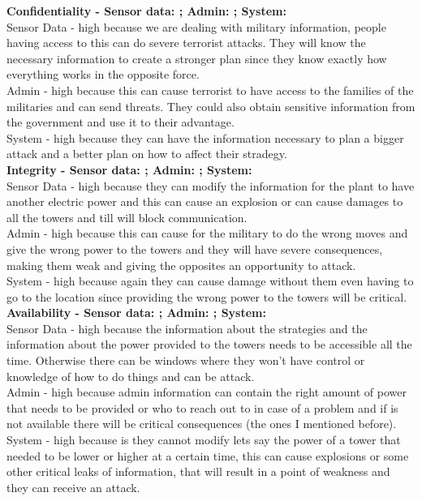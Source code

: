 \documentclass[12pt]{article}
\begin{document}
\begin{enumerate}
\begin{enumerate}
		\textbf{Confidentiality - Sensor data: ; Admin: ; System: } \\
		Sensor Data -  high because we are dealing with military information, people having access to this can do severe terrorist attacks. They will know the necessary information to create a stronger plan since they know exactly how everything works in the opposite force. \\
		Admin - high because this can cause terrorist to have access to the families of the militaries and can send threats. They could also obtain sensitive information from the government and use it to their advantage.  \\
		System - high because they can have the information necessary to plan a bigger attack and a better plan on how to affect their stradegy. \\
		
		\textbf{Integrity - Sensor data: ; Admin: ; System: } \\	
		Sensor Data - high because they can modify the information for the plant to have another electric power and this can cause an explosion or can cause damages to all the towers and till will block communication. \\
		Admin - high because this can cause for the military to do the wrong moves and give the wrong power to the towers and they will have severe consequences, making them weak and giving the opposites an opportunity to attack. \\
		System - high because again they can cause damage without them even having to go to the location since providing the wrong power to the towers will be critical.\\
		
		\textbf{Availability - Sensor data: ; Admin: ; System: } \\
		Sensor Data - high because the information about the strategies and the information about the power provided to the towers needs to be accessible all the time. Otherwise there can be windows where they won't have control or knowledge of how to do things and can be attack. \\
		Admin - high because admin information can contain the right amount of power that needs to be provided or who to reach out to in case of a problem and if is not available there will be critical consequences (the ones I mentioned before).\\
		System - high because is they cannot modify lets say the power of a tower that needed to be lower or higher at a certain time, this can cause explosions or some other critical leaks of information, that will result in a point of weakness and they can receive an attack. 
				

\end{enumerate}
\end{enumerate}
\end{document}
